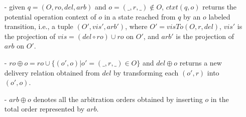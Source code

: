 \begin{itemize}
\begin {itemize}
    \item[-] %
      given $q = (O,\mathit{ro},\mathit{del},\mathit{arb})$ and $o=(\_,r,\_) \notin O$, ${\mathit{ctxt}}(q,o)$ returns the potential operation context of $o$ in a state reached from $q$ by an $o$ labeled transition, i.e., a tuple $(O',\mathit{vis}',\mathit{arb}')$, where $O' = \mathit{visTo}(O,r,\mathit{del})$, $\mathit{vis}'$ is the projection of $\mathit{vis}=(\mathit{del}\circ\mathit{ro})\cup\mathit{ro}$ on $O'$, and $\mathit{arb}'$ is the projection of $\mathit{arb}$ on $O'$.





    \item[-] $\mathit{ro} \oplus o = ro \cup \{ (o',o) \vert o' = (\_,r,\_) \in O \}$ and $\mathit{del} \oplus o$ returns a new delivery relation obtained from $del$ by transforming each $(o',r)$ into $(o',o)$.
    
    \item[-] $\mathit{arb}\oplus o$ denotes all the arbitration orders obtained by inserting $o$ in the total order represented by $\mathit{arb}$.


\end{itemize}
\end{itemize}
